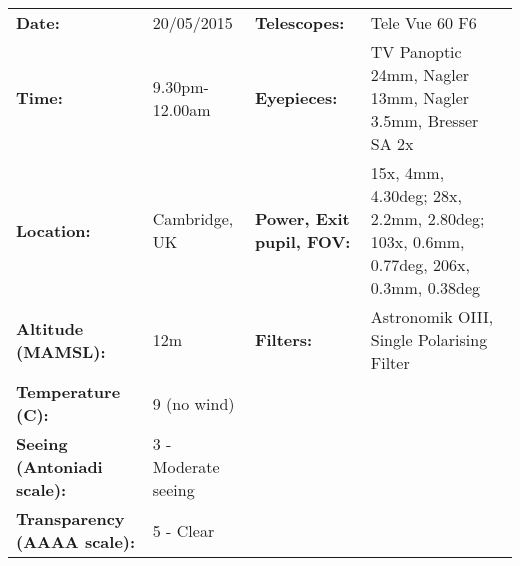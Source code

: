 \begin{tabular}{ p{1.7in} p{1.2in} p{1.5in} p{4.2in}}
{\bf Date:} & 20/05/2015 & {\bf Telescopes:} & Tele Vue 60 F6 \\ 
{\bf Time:} & 9.30pm-12.00am & {\bf Eyepieces:} & TV Panoptic 24mm, Nagler 13mm, Nagler 3.5mm, Bresser SA 2x \\ 
{\bf Location:} & Cambridge, UK & {\bf Power, Exit pupil, FOV:} & 15x, 4mm, 4.30deg; 28x, 2.2mm, 2.80deg; 103x, 0.6mm, 0.77deg, 206x, 0.3mm, 0.38deg \\ 
{\bf Altitude (MAMSL):} & 12m & {\bf Filters:} & Astronomik OIII, Single Polarising Filter \\ 
{\bf Temperature (C):} & 9 (no wind) & & \\ 
{\bf Seeing (Antoniadi scale):} & 3 - Moderate seeing & & \\ 
{\bf Transparency (AAAA scale):} & 5 - Clear & & \\ 
\end{tabular}
\centering 
